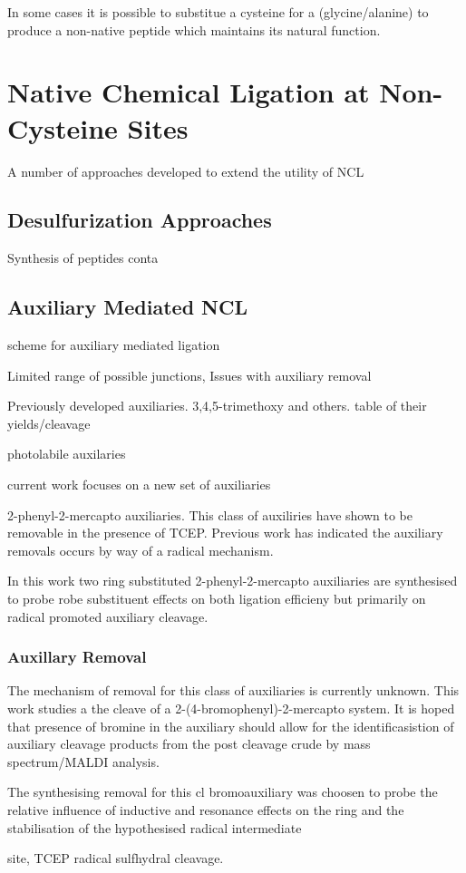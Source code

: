 In some cases it is possible to substitue a cysteine for a (glycine/alanine) to produce a non-native peptide which maintains its natural function.

\section{ Native Chemical Ligation at Non-Cysteine Sites}

A number of approaches developed to extend the utility of NCL

    \subsection{Desulfurization Approaches}

    Synthesis of peptides conta

    \subsection{Auxiliary Mediated NCL}


    scheme for auxiliary mediated ligation

    Limited range of possible junctions,
    Issues with auxiliary removal

    Previously developed auxiliaries.
    3,4,5-trimethoxy and others.
    table of their yields/cleavage

    photolabile auxilaries

    current work focuses on a new set of auxiliaries

    2-phenyl-2-mercapto auxiliaries. This class of auxiliries have shown to be removable in the presence of TCEP. Previous work has indicated the auxiliary removals occurs by way of a radical mechanism.

    In this work two ring substituted 2-phenyl-2-mercapto auxiliaries are synthesised to probe robe substituent effects on both ligation efficieny but primarily on radical promoted auxiliary cleavage.


        \subsubsection{Auxillary Removal}

        The mechanism of removal for this class of auxiliaries is currently unknown. This work studies a the cleave of a 2-(4-bromophenyl)-2-mercapto system. It is hoped that presence of bromine in the auxiliary should allow for the identificasistion of auxiliary cleavage products from the post cleavage crude by mass spectrum/MALDI analysis.

        The synthesising removal for this cl bromoauxiliary was choosen to probe the relative influence of inductive and resonance effects on the ring and the stabilisation of the hypothesised radical intermediate

        site, TCEP radical sulfhydral cleavage.



